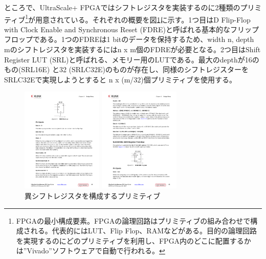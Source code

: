 ところで、UltraScale+ FPGAではシフトレジスタを実装するのに2種類のプリミティブ\footnote{FPGAの最小構成要素。FPGAの論理回路はプリミティブの組み合わせで構成される。代表的にはLUT、Flip Flop、RAMなどがある。目的の論理回路を実現するのにどのプリミティブを利用し、FPGA内のどこに配置するかは”Vivado”ソフトウェアで自動で行われる。}が用意されている。それぞれの概要を図\ref{SL_ShiftRegister}に示す。1つ目はD Flip-Flop with Clock Enable and Synchronous Reset (FDRE)と呼ばれる基本的なフリップフロップである。1つのFDREは1 bitのデータを保持するため、width n, depth mのシフトレジスタを実装するにはn x m個のFDREが必要となる。2つ目はShift Register LUT (SRL)と呼ばれる、メモリー用のLUTである。最大のdepthが16のもの(SRL16E) と32 (SRLC32E)のものが存在し、同様のシフトレジスターをSRLC32Eで実現しようとすると n x (m/32)個プリミティブを使用する。

\begin{figure}
\begin{minipage}[b]{.5\linewidth}
\centering
\includegraphics[height=5cm]{fig/SL/FDRE.pdf}
\end{minipage}%
\begin{minipage}[b]{.5\linewidth}
\centering
\includegraphics[height=5cm]{fig/SL/SRLC32E.pdf}
\end{minipage}%
\caption[シフトレジスタを構成するプリミティブ]{異シフトレジスタを構成するプリミティブ\cite{UltraScale_Architecture}}
\label{SL_ShiftRegister}
\end{figure}

